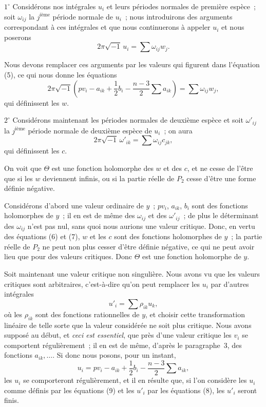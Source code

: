 \documentclass{article}
\begin{document}
$1^\circ$ Considérons nos intégrales $u_{i}$ et leurs périodes normales de première espèce~; soit $\omega_{ij}$ la $j^{\text{ième}}$ période normale de $u_{i}$~; nous introduirons des arguments correspondant à ces intégrales et que nous continuerons à appeler $u_{i}$ et nous poserons
\[
2 \pi \sqrt{-1} \, u_{i} = \sum \omega_{ij} w_{j}.
\]

Nous devons remplacer ces arguments par les valeurs qui figurent dans l'équation (5), ce qui nous donne les équations
\[
2 \pi \sqrt{-1} \left( p v_{i} - a_{ik} + \frac{1}{2} b_{i} - \frac{n - 3}{2} \sum a_{ik} \right) = \sum \omega_{ij} w_{j}, \tag{6}
\]
qui définissent les $w$.

$2^\circ$ Considérons maintenant les périodes normales de deuxième espèce et soit $\omega'_{ij}$ la $j^{\text{ième}}$ période normale de deuxième espèce de $u_{i}$~; on aura
\[
2 \pi \sqrt{-1} \, \omega'_{ik} = \sum \omega_{ij} c_{jk}, \tag{7}
\]
qui définissent les $c$.

On voit que $\Theta$ est une fonction holomorphe des $w$ et des $c$, et ne cesse de l'être que si les $w$ deviennent infinis, ou si la partie réelle de $P_{2}$ cesse d'être une forme définie négative.

Considérons d'abord une valeur ordinaire de $y$~; $p v_{i}$, $a_{ik}$, $b_{i}$ sont des fonctions holomorphes de $y$~; il en est de même des $\omega_{ij}$ et des $\omega'_{ij}$~; de plus le déterminant des $\omega_{ij}$ n'est pas nul, sans quoi nous aurions une valeur critique. Donc, en vertu des équations (6) et (7), $w$ et les $c$ sont des fonctions holomorphes de $y$~; la partie réelle de $P_{2}$ ne peut non plus cesser d'être définie négative, ce qui ne peut avoir lieu que pour des valeurs critiques. Donc $\Theta$ est une fonction holomorphe de $y$.

Soit maintenant une valeur critique non singulière. Nous avons vu que les valeurs critiques sont arbitraires, c'est-à-dire qu'on peut remplacer les $u_{i}$ par d'autres intégrales
\[
u'_{i} = \sum \rho_{ik} u_{k}, \tag{8}
\]
où les $\rho_{ik}$ sont des fonctions rationnelles de $y$, et choisir cette transformation linéaire de telle sorte que la valeur considérée ne soit plus critique. Nous avons supposé au début, et \emph{ceci est essentiel}, que près d'une valeur critique les $v_{i}$ se comportent régulièrement~; il en est de même, d'après le paragraphe~3, des fonctions $a_{ik}, \ldots$. Si donc nous
posons, pour un instant,
\[
u_{i} = p v_{i} - a_{ik} + \frac{1}{2} b_{i} - \frac{n - 3}{2} \sum a_{ik}, \tag{9}
\]
les $u_{i}$ se comporteront régulièrement, et il en résulte que, si l'on considère les $u_{i}$ comme définis par les équations (9) et les $u'_{i}$ par les équations (8), les $u'_{i}$ seront finis.
\end{document}
